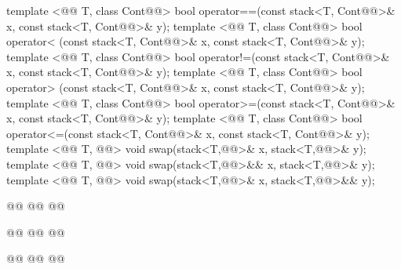 \documentclass[american,twoside]{book}
\begin{document}
\begin{codeblock}
{  template <@@ T, class Cont@@>
    bool operator==(const stack<T, Cont@@>& x, const stack<T, Cont@@>& y);
  template <@@ T, class Cont@@>
    bool operator< (const stack<T, Cont@@>& x, const stack<T, Cont@@>& y);
  template <@@ T, class Cont@@>
    bool operator!=(const stack<T, Cont@@>& x, const stack<T, Cont@@>& y);
  template <@@ T, class Cont@@>
    bool operator> (const stack<T, Cont@@>& x, const stack<T, Cont@@>& y);
  template <@@ T, class Cont@@>
    bool operator>=(const stack<T, Cont@@>& x, const stack<T, Cont@@>& y);
  template <@@ T, class Cont@@>
    bool operator<=(const stack<T, Cont@@>& x, const stack<T, Cont@@>& y);
  template <@@ T, @@>
    void swap(stack<T,@@>& x, stack<T,@@>& y);
  template <@@ T, @@>
    void swap(stack<T,@@>&& x, stack<T,@@>& y);
  template <@@ T, @@>
    void swap(stack<T,@@>& x, stack<T,@@>&& y);

  @@
    @@
    @@

  @@
    @@
      @@

  @@
    @@
      @@
}
\end{codeblock}
\end{document}
